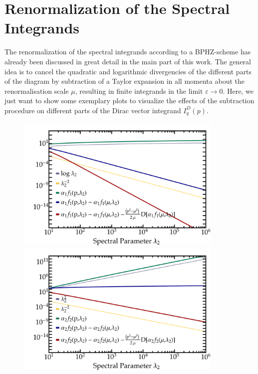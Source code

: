 \section*{Renormalization of the Spectral Integrands}
The renormalization of the spectral integrands according to a BPHZ-scheme has already been discussed in great detail in the main part of this work. The general idea is to cancel the quadratic and logarithmic divergencies of the different parts of the diagram by subtraction of a Taylor expansion in all momenta about the renormalisation scale $\mu$, resulting in finite integrands in the limit $\varepsilon\rightarrow 0$.
Here, we just want to show some exemplary plots to visualize the effects of the subtraction procedure on different parts of the Dirac vector integrand $I_q^D(p)$.
 \begin{figure}[H] 
 \centering
	\begin{minipage}{0.8\textwidth}
		\includegraphics[width = 0.88\textwidth]{figs/plots/FiniteIntegrands1}
	\end{minipage}
	\begin{minipage}{0.8\textwidth}
		\includegraphics[width = 0.88\textwidth]{figs/plots/FiniteIntegrands2}

\end{minipage}
\end{figure}
